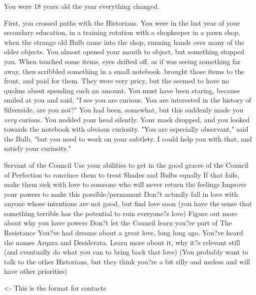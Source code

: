 \documentclass[char]{Silversiders}
\begin{document}
You were 18 years old the year everything changed.

First, you crossed paths with the Historians. You were in the last year of your secondary education, in a training rotation with a shopkeeper in a pawn shop, when the strange old Bulb came into the shop, running \cHonor{\their} hands over many of the older objects. You almost opened your mouth to object, but something stopped you. When \cHonor{\they} touched some items, \cHonor{\their} eyes drifted off, as if \cHonor{\they} was seeing something far away, then \cHonor{\they} scribbled something in a small notebook. \cHonor{\They} brought those items to the front, and paid for them. They were very pricy, but the \cHonor{\human} seemed to have no qualms about spending such an amount. You must have been staring, because \cHonor{\they} smiled at you and said, "I see you are curious. You are interested in the history of Silverside, are you not?" You had been, somewhat, but this suddenly made you \emph{very} curious. You nodded your head silently. Your mask dropped, and you looked towards the notebook with obvious curiosity. "You are especially observant," said the Bulb, "but you need to work on your subtlety. I could help you with that, and satisfy your curiosity."



Servant of the Council
Use your abilities to get in the good graces of the Council of Perfection to convince them to treat Shades and Bulbs equally
If that fails, make them sick with love to someone who will never return the feelings
Improve your powers to make this possible/permanent
Don?t actually fall in love with anyone whose intentions are not good, but find love soon (you have the sense that something terrible has the potential to ruin everyone?s love)
Figure out more about why you have powers
Don?t let the Council learn you?re part of The Resistance
You?ve had dreams about a great love, long long ago. You?ve heard the names Arqara and Desiderata. Learn more about it, why it?s relevant still (and eventually do what you can to bring back that love)
(You probably want to talk to the other Historians, but they think you?re a bit silly and useless and will have other priorities)

\begin{itemz}[Goals]
	\item 
\end{itemz}

\begin{itemz}[Notes]
	\item 
\end{itemz}

\begin{contacts}
	\contact{\cTest{}} <- This is the format for contacts 
\end{contacts}
\end{document}
